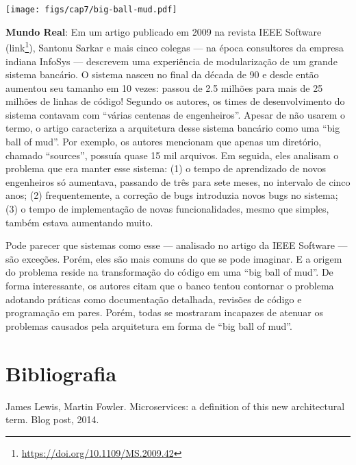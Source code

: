 \documentclass[
  11pt,
  twoside]{book}
\DeclareRobustCommand{\href}[2]{#2\footnote{\url{#1}}}
\newenvironment{esmbox}{\centering \vspace{1.5ex} \begin{tcolorbox}[breakable, colback=backcolor, width=4.9in]}{\end{tcolorbox} \vspace{1.5ex}}
\let\origfigure\figure
\let\endorigfigure\endfigure
\renewenvironment{figure}[1][2] {
    \expandafter\origfigure\expandafter[!h]
} {
    \endorigfigure
}
\begin{document}
\begin{figure}
\centering
\texttt{[image: figs/cap7/big-ball-mud.pdf]}
\caption{Anti-padrão \emph{big ball of mud}}
\end{figure}


\begin{esmbox}

\textbf{Mundo Real}: Em um artigo publicado em 2009 na revista IEEE
Software (\href{https://doi.org/10.1109/MS.2009.42}{link}), Santonu
Sarkar e mais cinco colegas --- na época consultores da empresa indiana
InfoSys --- descrevem uma experiência de modularização de um grande
sistema bancário. O sistema nasceu no final da década de 90 e desde
então aumentou seu tamanho em 10 vezes: passou de 2.5 milhões para mais
de 25 milhões de linhas de código! Segundo os autores, os times de
desenvolvimento do sistema contavam com ``várias centenas de
engenheiros''. Apesar de não usarem o termo, o artigo caracteriza a
arquitetura desse sistema bancário como uma ``big ball of mud''. Por
exemplo, os autores mencionam que apenas um diretório, chamado
``sources'', possuía quase 15 mil arquivos. Em seguida, eles analisam o
problema que era manter esse sistema: (1) o tempo de aprendizado de
novos engenheiros só aumentava, passando de três para sete meses, no
intervalo de cinco anos; (2) frequentemente, a correção de bugs
introduzia novos bugs no sistema; (3) o tempo de implementação de novas
funcionalidades, mesmo que simples, também estava aumentando muito.

Pode parecer que sistemas como esse --- analisado no artigo da IEEE
Software --- são exceções. Porém, eles são mais comuns do que se pode
imaginar. E a origem do problema reside na transformação do código em
uma ``big ball of mud''. De forma interessante, os autores citam que o
banco tentou contornar o problema adotando práticas como documentação
detalhada, revisões de código e programação em pares. Porém, todas se
mostraram incapazes de atenuar os problemas causados pela arquitetura em
forma de ``big ball of mud''.

\end{esmbox}

\hypertarget{bibliografia-6}{%
\section*{Bibliografia}\label{bibliografia-6}}

James Lewis, Martin Fowler. Microservices: a definition of this new
architectural term. Blog post, 2014.
\end{document}
